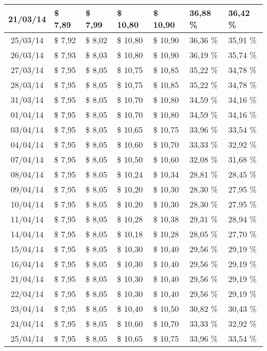 \begin{center}
\begin{longtable}{|c|p{1.5cm}|p{1.5cm}|p{1.5cm}|p{1.5cm}|p{1.5cm}|p{1.5cm}|}
21/03/14 & \$ 7,89 & \$ 7,99 & \$ 10,80 & \$ 10,90 & 36,88 \% & 36,42 \% \\ \hline
25/03/14 & \$ 7,92 & \$ 8,02 & \$ 10,80 & \$ 10,90 & 36,36 \% & 35,91 \% \\ \hline
26/03/14 & \$ 7,93 & \$ 8,03 & \$ 10,80 & \$ 10,90 & 36,19 \% & 35,74 \% \\ \hline
27/03/14 & \$ 7,95 & \$ 8,05 & \$ 10,75 & \$ 10,85 & 35,22 \% & 34,78 \% \\ \hline
28/03/14 & \$ 7,95 & \$ 8,05 & \$ 10,75 & \$ 10,85 & 35,22 \% & 34,78 \% \\ \hline
31/03/14 & \$ 7,95 & \$ 8,05 & \$ 10,70 & \$ 10,80 & 34,59 \% & 34,16 \% \\ \hline
01/04/14 & \$ 7,95 & \$ 8,05 & \$ 10,70 & \$ 10,80 & 34,59 \% & 34,16 \% \\ \hline
03/04/14 & \$ 7,95 & \$ 8,05 & \$ 10,65 & \$ 10,75 & 33,96 \% & 33,54 \% \\ \hline
04/04/14 & \$ 7,95 & \$ 8,05 & \$ 10,60 & \$ 10,70 & 33,33 \% & 32,92 \% \\ \hline
07/04/14 & \$ 7,95 & \$ 8,05 & \$ 10,50 & \$ 10,60 & 32,08 \% & 31,68 \% \\ \hline
08/04/14 & \$ 7,95 & \$ 8,05 & \$ 10,24 & \$ 10,34 & 28,81 \% & 28,45 \% \\ \hline
09/04/14 & \$ 7,95 & \$ 8,05 & \$ 10,20 & \$ 10,30 & 28,30 \% & 27,95 \% \\ \hline
10/04/14 & \$ 7,95 & \$ 8,05 & \$ 10,20 & \$ 10,30 & 28,30 \% & 27,95 \% \\ \hline
11/04/14 & \$ 7,95 & \$ 8,05 & \$ 10,28 & \$ 10,38 & 29,31 \% & 28,94 \% \\ \hline
14/04/14 & \$ 7,95 & \$ 8,05 & \$ 10,18 & \$ 10,28 & 28,05 \% & 27,70 \% \\ \hline
15/04/14 & \$ 7,95 & \$ 8,05 & \$ 10,30 & \$ 10,40 & 29,56 \% & 29,19 \% \\ \hline
16/04/14 & \$ 7,95 & \$ 8,05 & \$ 10,30 & \$ 10,40 & 29,56 \% & 29,19 \% \\ \hline
21/04/14 & \$ 7,95 & \$ 8,05 & \$ 10,30 & \$ 10,40 & 29,56 \% & 29,19 \% \\ \hline
22/04/14 & \$ 7,95 & \$ 8,05 & \$ 10,30 & \$ 10,40 & 29,56 \% & 29,19 \% \\ \hline
23/04/14 & \$ 7,95 & \$ 8,05 & \$ 10,40 & \$ 10,50 & 30,82 \% & 30,43 \% \\ \hline
24/04/14 & \$ 7,95 & \$ 8,05 & \$ 10,60 & \$ 10,70 & 33,33 \% & 32,92 \% \\ \hline
25/04/14 & \$ 7,95 & \$ 8,05 & \$ 10,65 & \$ 10,75 & 33,96 \% & 33,54 \% \\ \hline

\end{longtable}
\end{center}
